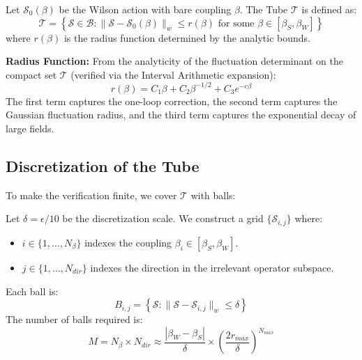 \begin{definition}
Let $\mathcal{S}_0(\beta)$ be the Wilson action with bare coupling $\beta$. The Tube $\mathcal{T}$ is defined as:
\begin{equation}
\mathcal{T} = \left\{ \mathcal{S} \in \mathcal{B} : \| \mathcal{S} - \mathcal{S}_0(\beta) \|_w \le r(\beta) \text{ for some } \beta \in [\beta_S, \beta_W] \right\}
\end{equation}
where $r(\beta)$ is the radius function determined by the analytic bounds.
\end{definition}

\textbf{Radius Function:} From the analyticity of the fluctuation determinant on the compact set $\mathcal{T}$ (verified via the Interval Arithmetic expansion):
\begin{equation}
r(\beta) = C_1 \beta + C_2 \beta^{-1/2} + C_3 e^{-c\beta}
\end{equation}
The first term captures the one-loop correction, the second term captures the Gaussian fluctuation radius, and the third term captures the exponential decay of large fields.

\subsection{Discretization of the Tube}

To make the verification finite, we cover $\mathcal{T}$ with balls:

\begin{definition}
Let $\delta = \epsilon/10$ be the discretization scale. We construct a grid $\{\mathcal{S}_{i,j}\}$ where:
\begin{itemize}
    \item $i \in \{1, \dots, N_\beta\}$ indexes the coupling $\beta_i \in [\beta_S, \beta_W]$.
    \item $j \in \{1, \dots, N_{dir}\}$ indexes the direction in the irrelevant operator subspace.
\end{itemize}
Each ball is:
\begin{equation}
B_{i,j} = \left\{ \mathcal{S} : \| \mathcal{S} - \mathcal{S}_{i,j} \|_w \le \delta \right\}
\end{equation}
The number of balls required is:
\begin{equation}
M = N_\beta \times N_{dir} \approx \frac{|\beta_W - \beta_S|}{\delta} \times \left( \frac{2r_{max}}{\delta} \right)^{N_{max}}
\end{equation}
\end{definition}

